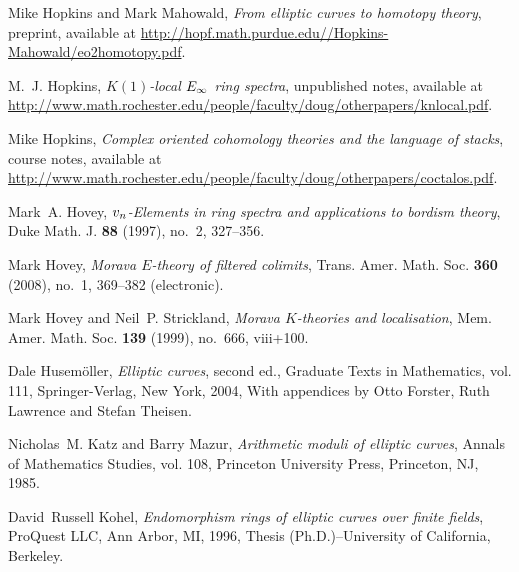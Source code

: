 \documentclass{gtpart}
\theoremstyle{definition}
\theoremstyle{remark}
\numberwithin{equation}{section}
\numberwithin{thm}{section}
\begin{document}
\begin{thebibliography}
Mike Hopkins and Mark Mahowald, \emph{From elliptic curves to homotopy theory},
  preprint, available at
  \href{http://hopf.math.purdue.edu//Hopkins-Mahowald/eo2homotopy.pdf}{http://hopf.math.purdue.edu//Hopkins-Mahowald/eo2homotopy.pdf}.

M.~J. Hopkins, \emph{{$K(1)$}-local {$E\sb \infty $} ring spectra}, unpublished
  notes, available at 
  \href{http://www.math.rochester.edu/people/faculty/doug/otherpapers/knlocal.pdf}{http://\linebreak www.math.rochester.edu/people/faculty/doug/otherpapers/knlocal.pdf}.

Mike Hopkins, \emph{Complex oriented cohomology theories and the language of
  stacks}, course notes, available at 
  \href{http://www.math.rochester.edu/people/faculty/doug/otherpapers/coctalos.pdf}{http://www.math.rochester.edu/people/faculty/doug/\linebreak otherpapers/coctalos.pdf}.

Mark~A. Hovey, \emph{{$v\sb n$}-{E}lements in ring spectra and applications to
  bordism theory}, Duke Math. J. \textbf{88} (1997), no.~2, 327--356.

Mark Hovey, \emph{Morava {$E$}-theory of filtered colimits}, Trans. Amer. Math.
  Soc. \textbf{360} (2008), no.~1, 369--382 (electronic). 

Mark Hovey and Neil~P. Strickland, \emph{Morava {$K$}-theories and
  localisation}, Mem. Amer. Math. Soc. \textbf{139} (1999), no.~666, viii+100.

Dale Husem{\"o}ller, \emph{Elliptic curves}, second ed., Graduate Texts in
  Mathematics, vol. 111, Springer-Verlag, New York, 2004, With appendices by
  Otto Forster, Ruth Lawrence and Stefan Theisen. 

Nicholas~M. Katz and Barry Mazur, \emph{Arithmetic moduli of elliptic curves},
  Annals of Mathematics Studies, vol. 108, Princeton University Press,
  Princeton, NJ, 1985. 

David~Russell Kohel, \emph{Endomorphism rings of elliptic curves over finite
  fields}, ProQuest LLC, Ann Arbor, MI, 1996, Thesis (Ph.D.)--University of
  California, Berkeley. 


\end{thebibliography}
\end{document}
